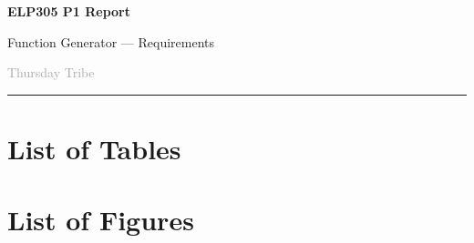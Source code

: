 \documentclass[a4paper,12pt]{article}
\begin{document}
\begin{center}
    {\Huge\textbf{ELP305 P1 Report}\par}
    \vspace{0.15cm}
    {\Large Function Generator --- Requirements\par}    
    \vspace{0.1cm}
    \large \textcolor{darkgray}{Thursday Tribe}
\end{center}

\hspace*{-1in}  
\rule{1.2\linewidth}{0.4pt}

\begin{figure}[H]
\hspace*{-0.72in}  
\begin{minipage}[t]{0.7\textwidth}
    \centering
     
    \label{fig:front_cover}
\end{minipage}
\end{figure}




\tableofcontents

\newpage
\section{List of Tables}
\listoftables

\newpage
\section{List of Figures}
\listoffigures




\end{document}
